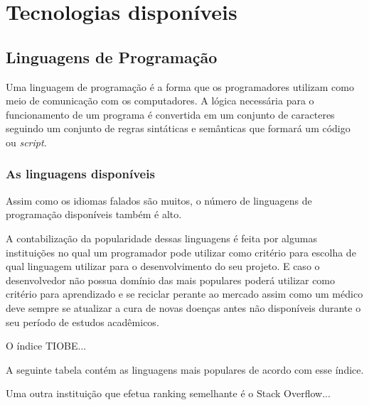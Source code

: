\chapter{Tecnologias disponíveis} \label{Tecnologias disponíveis}

\section{Linguagens de Programação}

Uma linguagem de programação é a forma que os programadores utilizam como meio de comunicação com os computadores. A lógica necessária para o funcionamento de um programa é convertida em um conjunto de caracteres seguindo um conjunto de regras sintáticas e semânticas que formará um código ou \textit{script}.

\subsection{As linguagens disponíveis}

Assim como os idiomas falados são muitos, o número de linguagens de programação disponíveis também é alto.

A contabilização da popularidade dessas linguagens é feita por algumas instituições no qual um programador pode utilizar como critério para escolha de qual linguagem utilizar para o desenvolvimento do seu projeto. E caso o desenvolvedor não possua domínio das mais populares poderá utilizar como critério para aprendizado e se reciclar perante ao mercado assim como um médico deve sempre se atualizar a cura de novas doenças antes não disponíveis durante o seu período de estudos acadêmicos.


O índice TIOBE...

A seguinte tabela contém as linguagens mais populares de acordo com esse índice.

Uma outra instituição que efetua ranking semelhante é o Stack Overflow...

